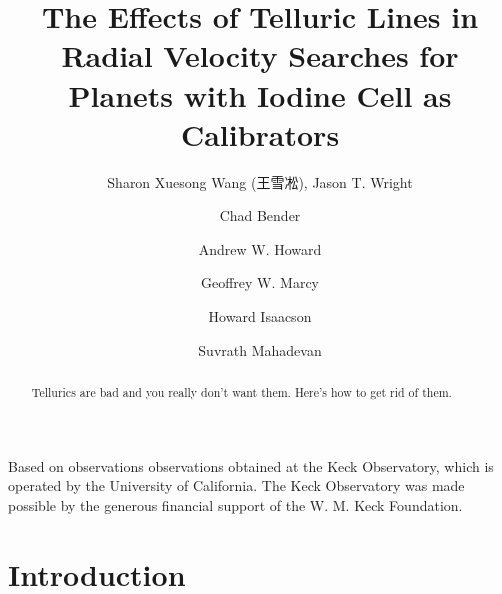 \documentclass{emulateapj}
\begin{document}

\begin{CJK*}{UTF8}{gbsn}

\title
{
The Effects of Telluric Lines in Radial Velocity Searches for Planets with Iodine
Cell as Calibrators
}

{
Based on observations observations obtained at the Keck Observatory, which is operated
by the University of California.  The Keck Observatory was made
possible by the generous financial support of the W. M. Keck
Foundation.
}

\author{Sharon Xuesong Wang (王雪凇),
  Jason T. Wright} %
\author{Chad Bender} %
\author{Andrew W. Howard} %
\author{Geoffrey W. Marcy} %
\author{Howard Isaacson} %
\author{Suvrath Mahadevan} %







\begin{abstract}

Tellurics are bad and you really don't want them. Here's how to get
rid of them.

\end{abstract}



\section{Introduction}\label{sec:intro}


\end{CJK*}
\end{document}
